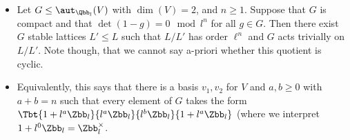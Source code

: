 \documentclass{amsart}
\begin{document}
\begin{itemize}
   \item Let $G \leq \aut_{\Qbb_l} (V)$ with $\dim(V)=2$, and $n\geq 1$. Suppose that $G$ is compact and that $\det(1-g) = 0 \mod l^n$ for all $g\in G$.  Then there exist $G$ stable lattices $L'\leq L$ such that $L/L'$ has order $\ell^n$ and $G$ acts trivially on $L/L'$. Note though, that we cannot say a-priori whether this quotient is cyclic. 
   \item Equivalently, this says that there is a basis $v_1,v_2$ for $V$ and $a,b \geq 0$ with $a+b =n$ such that every element of $G$ takes the form $\Tbt{1+l^a \Zbb_l}{l^a \Zbb_l}{l^b \Zbb_l}{1+l^a \Zbb_l}$ (where we interpret $1+l^0 \Zbb_l = \Zbb_l^\times$. 
 
\end{itemize}
\end{document}

